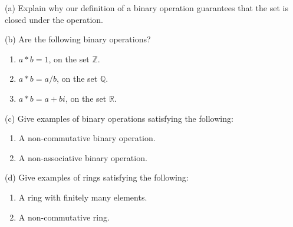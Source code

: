 \begin{problem}[Warmup]{(a)}
    Explain why our definition of a binary operation guarantees that the set is closed under the operation.
\end{problem}
\unsolved

\begin{problem}[Warmup]{(b)}
    Are the following binary operations?
    \begin{enumerate}
        \item[(a)] $a * b = 1$, on the set $\mathbb{Z}$.
        \item[(b)] $a * b = a/b$, on the set $\mathbb{Q}$.
        \item[(c)] $a * b = a + bi$, on the set $\mathbb{R}$.
    \end{enumerate}
\end{problem}
\unsolved

\begin{problem}[Warmup]{(c)}
    Give examples of binary operations satisfying the following:
    \begin{enumerate}
        \item[(a)] A non-commutative binary operation.
        \item[(b)] A non-associative binary operation.
    \end{enumerate}
\end{problem}
\unsolved

\begin{problem}[Warmup]{(d)}
    Give examples of rings satisfying the following:
    \begin{enumerate}
        \item[(a)] A ring with finitely many elements.
        \item[(b)] A non-commutative ring.
    \end{enumerate}
\end{problem}
\unsolved

